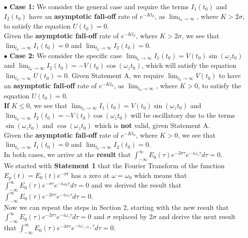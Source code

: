 \documentclass[11pt]{elsarticle}
\begin{document}
$\bullet$ \textbf{Case 1:} We consider the general case and require the terms $I_1(t_0)$ and $I_2(t_0)$ have an \textbf{asymptotic fall-off }rate of $e^{-K t_0}$, as  $\lim_{t_0 \to \infty}$, where $K > 2 \sigma$, to satisfy the equation $U(t_0) = 0$. \\

Given the \textbf{asymptotic fall-off }rate of $e^{-K t_0}$, where $K > 2 \sigma$, we see that $\lim_{t_0 \to \infty} I_1(t_0) = 0$ and $\lim_{t_0 \to \infty} I_2(t_0) = 0$.\\

$\bullet$ \textbf{Case 2:} We consider the specific case $\lim_{t_0 \to \infty} I_1(t_0) = V(t_0) \sin{ (\omega_z  t_0)}$ and 
$\lim_{t_0 \to \infty} I_2(t_0) = -V(t_0) \cos{ (\omega_z  t_0)}$, which will satisfy the equation $\lim_{t_0 \to \infty} U(t_0)= 0$. Given Statement A, we require $\lim_{t_0 \to \infty} V(t_0)$ to have an \textbf{asymptotic fall-off }rate of $e^{-K t_0}$, as  $\lim_{t_0 \to \infty}$, where $K > 0$, to satisfy the equation  $U(t_0) = 0$. \\

\textbf{If} $K \leq 0$, we see that $\lim_{t_0 \to \infty} I_1(t_0) = V(t_0) \sin{ (\omega_z  t_0)}$ and $\lim_{t_0 \to \infty} I_2(t_0) = -V(t_0) \cos{ (\omega_z  t_0)}$ will be oscillatory due to the terms $ \sin{ (\omega_z  t_0)}$ and $ \cos{ (\omega_z  t_0)}$ which is \textbf{not} valid, given Statement A.  \\

Given the \textbf{asymptotic fall-off }rate of $e^{-K t_0}$, where $K > 0$, we see that $\lim_{t_0 \to \infty} I_1(t_0) = 0$ and $\lim_{t_0 \to \infty} I_2(t_0) = 0$.\\

In both cases, we arrive at the \textbf{result} that $\int_{-\infty}^{\infty}     E_0(\tau) e^{-2 \sigma \tau} e^{-i  \omega_z \tau} d\tau = 0$. \\


We started with \textbf{Statement 1} that the Fourier Transform of the function $E_p(t) = E_0(t) e^{-\sigma t} $ has a zero at $\omega = \omega_{0}$ which means that $\int_{-\infty}^{\infty}    E_0(\tau) e^{- \sigma \tau} e^{-i \omega_0 \tau} d\tau = 0$ and we derived the result that $\int_{-\infty}^{\infty}    E_0(\tau) e^{-2 \sigma \tau} e^{-i  \omega_z \tau} d\tau = 0$.\\

Now we can repeat the steps in Section 2, starting with the new result that $\int_{-\infty}^{\infty}    E_0(\tau) e^{-2 \sigma \tau} e^{-i \omega_z \tau} d\tau = 0$ and $\sigma$ replaced by $2 \sigma$ and derive the next result that $\int_{-\infty}^{\infty}    E_0(\tau) e^{-4 \sigma \tau} e^{-i \omega_{(z1)} \tau} d\tau = 0$.\\
\end{document}
